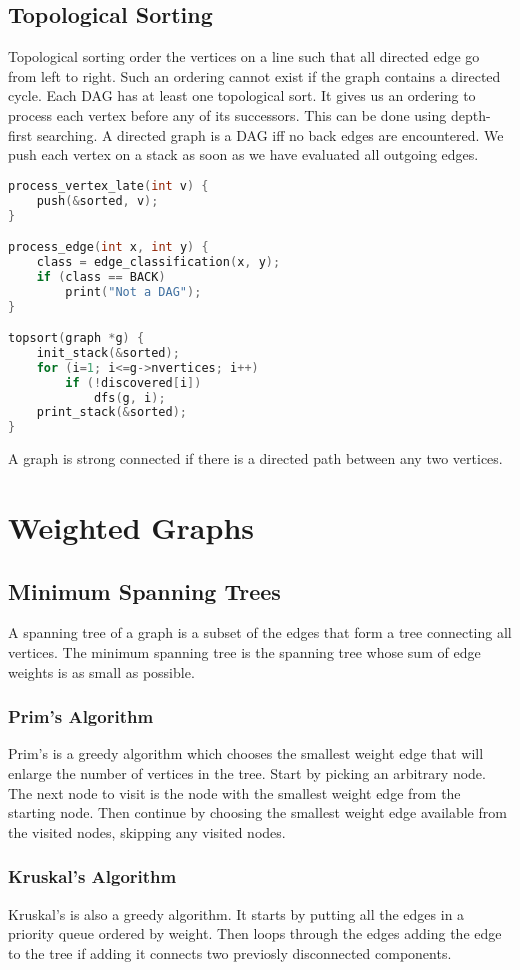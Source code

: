 \documentclass[10pt]{article}
\theoremstyle{definition}
\begin{document}
\subsection{Topological Sorting}
Topological sorting order the vertices on a line such that all directed edge go from left to right. Such an ordering cannot exist if the graph contains a directed cycle. Each DAG has at least one topological sort. It gives us an ordering to process each vertex before any of its successors. This can be done using depth-first searching. A directed graph is a DAG iff no back edges are encountered. We push each vertex on a stack as soon as we have evaluated all outgoing edges.
\begin{lstlisting}[language=C]
process_vertex_late(int v) {
    push(&sorted, v);
}

process_edge(int x, int y) {
    class = edge_classification(x, y);
    if (class == BACK)
        print("Not a DAG");
}

topsort(graph *g) {
    init_stack(&sorted);
    for (i=1; i<=g->nvertices; i++)
        if (!discovered[i])
            dfs(g, i);
    print_stack(&sorted);
}
\end{lstlisting}

A graph is strong connected if there is a directed path between any two vertices.

\section{Weighted Graphs}

\subsection{Minimum Spanning Trees}
A spanning tree of a graph is a subset of the edges that form a tree connecting all vertices. The minimum spanning tree is the spanning tree whose sum of edge weights is as small as possible.
\subsubsection{Prim's Algorithm}
Prim's is a greedy algorithm which chooses the smallest weight edge that will enlarge the number of vertices in the tree. Start by picking an arbitrary node. The next node to visit is the node with the smallest weight edge from the starting node. Then continue by choosing the smallest weight edge available from the visited nodes, skipping any visited nodes.
\subsubsection{Kruskal's Algorithm}
Kruskal's is also a greedy algorithm. It starts by putting all the edges in a priority queue ordered by weight. Then loops through the edges adding the edge to the tree if adding it connects two previosly disconnected components.
\end{document}
